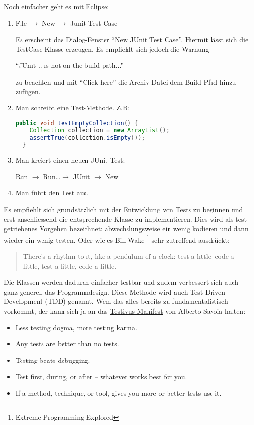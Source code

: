Noch einfacher geht es mit Eclipse:
\begin{enumerate}
\item File $\longrightarrow$ New $\longrightarrow$ Junit Test Case

 Es erscheint das Dialog-Fenster ``New JUnit Test Case''. Hiermit
lässt sich die TestCase-Klasse erzeugen. Es empfiehlt sich jedoch
die Warnung

``JUnit .. is not on the build path...''

zu beachten und mit ``Click here'' die Archiv-Datei dem Build-Pfad
hinzu zufügen.
\newslide
\item Man schreibt eine Test-Methode. Z.B:
\begin{lstlisting}[language=java]
  public void testEmptyCollection() {
    Collection collection = new ArrayList();
    assertTrue(collection.isEmpty());
  }
 \end{lstlisting}
\newslide
\item Man kreiert einen neuen JUnit-Test:

Run $\longrightarrow$ Run\ldots $\longrightarrow$ JUnit $\longrightarrow$ New

\item Man führt den Test aus.
\end{enumerate}
\newslide
Es empfiehlt sich grundsätzlich mit der Entwicklung von Tests zu beginnen und
 erst anschliessend die entsprechende Klasse zu implementieren.
Dies wird als test-getriebenes Vorgehen bezeichnet:
abwechslungsweise
ein wenig kodieren und dann wieder ein wenig testen. Oder
wie es Bill Wake \footnote{Extreme Programming Explored}
sehr zutreffend ausdrückt:
\begin{quote}
There's a rhythm to it, like a pendulum of a clock: test a little,
code a little, test a little, code a little.
\end{quote}
Die Klassen
 werden dadurch einfacher testbar und zudem verbessert sich auch ganz generell
 das Programmdesign. Diese Methode wird auch Test-Driven-Development (TDD)
 genannt.
\newslide
Wem das alles bereits zu fundamentalistisch vorkommt,
der kann sich ja an das
\href{http://www.developertesting.com/archives/month200702/20070206-000391.html}
{Testivus-Manifest}
von Alberto Savoia halten:
\begin{itemize}
\item Less testing dogma, more testing karma.
\item Any tests are better than no tests.
\item Testing beats debugging.
\item Test first, during, or after -- whatever works best for you.
\item If a method, technique, or tool, gives you more or better tests use it.
\end{itemize}
%
\newslide
